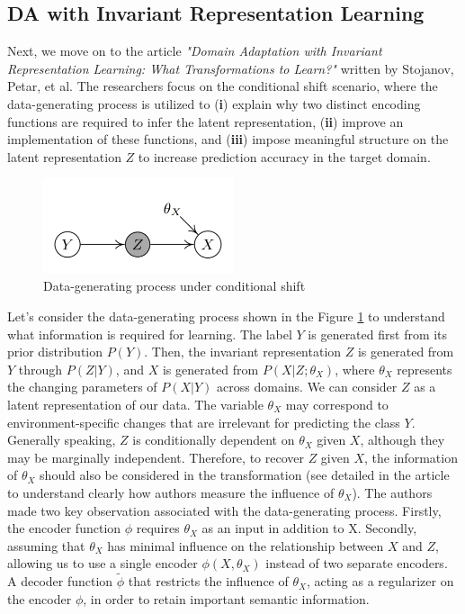 \subsection{DA with Invariant Representation Learning}
 Next, we move on to the article \textit{"Domain Adaptation with Invariant Representation Learning: What Transformations to Learn?"} written by Stojanov, Petar, et al. \cite{stojanov2021domain} The researchers focus on the conditional shift scenario, where the data-generating process is utilized to (\textbf{i}) explain why two distinct encoding functions are required to infer the latent representation, (\textbf{ii}) improve an implementation of these functions, and (\textbf{iii}) impose meaningful structure on the latent representation $Z$ to increase prediction accuracy in the target domain.

\begin{figure}[H]
    \centering
    \includegraphics[width=0.5\textwidth]{Figures/From articles/DA_transforms.png}
    \caption{Data-generating process under conditional shift}
    \label{fig: DA_transf}
\end{figure}

Let's consider the data-generating process shown in the Figure \ref{fig: DA_transf} to understand what information is required for learning. The label $Y$ is generated first from its prior distribution $P(Y)$. Then, the invariant representation $Z$ is generated from $Y$ through $P(Z|Y)$, and $X$ is generated from $P(X|Z; \theta_X)$, where $\theta_X$ represents the changing parameters of $P(X|Y)$ across domains. We can consider $Z$ as a latent representation of our data. The variable $\theta_X$ may correspond to environment-specific changes that are irrelevant for predicting the class $Y$. Generally speaking, $Z$ is conditionally dependent on $\theta_X$ given $X$, although they may be marginally independent. Therefore, to recover $Z$ given $X$, the information of $\theta_X$ should also be considered in the transformation (see detailed in the article to understand clearly how authors measure the influence of $\theta_X$). The authors made two key observation associated with the data-generating process. Firstly, the encoder function $\phi$ requires $\theta_X$ as an input in addition to X. Secondly, assuming that $\theta_X$ has minimal influence on the relationship between $X$ and $Z$, allowing us to use a single encoder $\phi(X, \theta_X)$ instead of two separate encoders. A decoder function $\widetilde{\phi}$ that restricts the influence of $\theta_X$, acting as a regularizer on the encoder $\phi$, in order to retain important semantic information.

